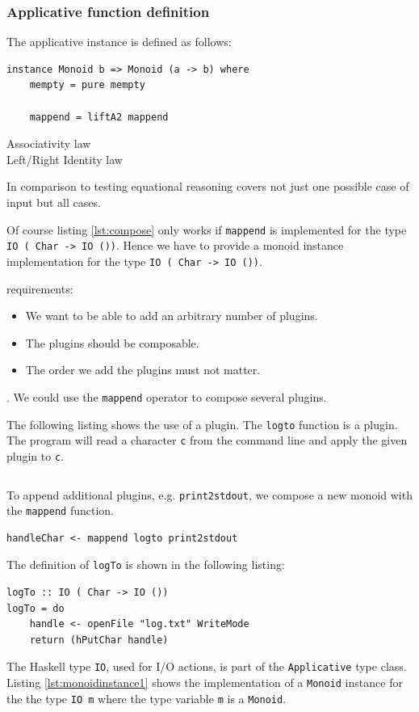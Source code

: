 \subsubsection{Applicative function definition}
 The applicative instance is defined as follows:
\begin{verbatim}
instance Monoid b => Monoid (a -> b) where
    mempty = pure mempty

    mappend = liftA2 mappend
\end{verbatim}

\begin{description}
\item[Associativity law] 
\item[Left/Right Identity law] 
\end{description}

In comparison to testing equational reasoning covers not just one possible case of input but all cases.


Of course listing \ref{lst:compose} only works if \verb|mappend| is implemented for the type \verb|IO ( Char -> IO ())|. Hence we have to provide a monoid instance implementation for the type \verb|IO ( Char -> IO ())|.



 requirements:
\begin{itemize}
\item We want to be able to add an arbitrary number of plugins.
\item The plugins should be composable.
\item The order we add the plugins must not matter.
\end{itemize}

. We could use the \verb|mappend| operator to compose several plugins. 

The following listing shows the use of a plugin. The \verb|logto| function is a plugin. The program will read a character \verb|c| from the command line and apply the given plugin to \verb|c|.

\begin{lstlisting}

\end{lstlisting}

To append additional plugins, e.g. \verb|print2stdout|, we compose a new monoid with the \verb|mappend| function.
\begin{verbatim}
handleChar <- mappend logto print2stdout
\end{verbatim}
The definition of \verb|logTo| is shown in the following listing: 

\begin{verbatim}
logTo :: IO ( Char -> IO ())
logTo = do
    handle <- openFile "log.txt" WriteMode
    return (hPutChar handle)
\end{verbatim}


The Haskell type \verb|IO|, used for I/O actions, is part of the \verb|Applicative| type class. Listing \ref{lst:monoidinstance1} shows the implementation of a \verb|Monoid| instance for the the type \verb|IO m| where the type variable \verb|m| is a \verb|Monoid|. 
